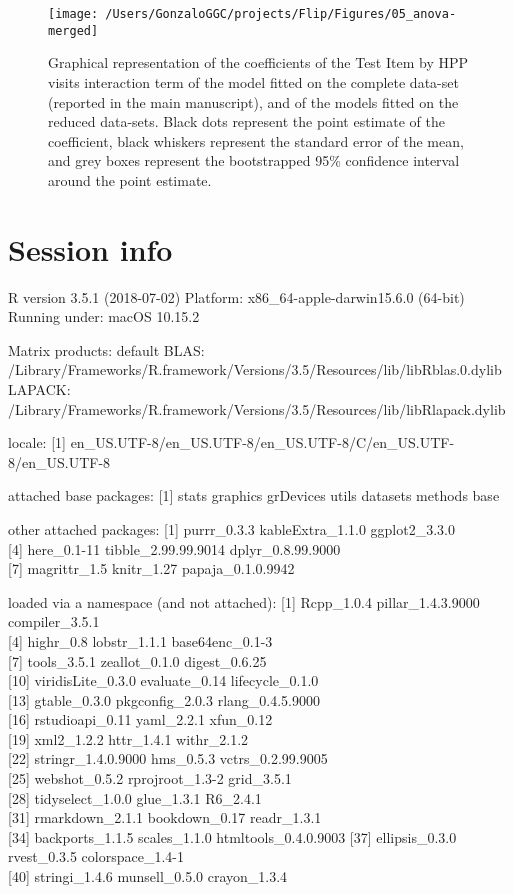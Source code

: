 \documentclass[english,man,man,floatsintext]{apa6}
\begin{document}
\begin{appendix}
\begin{figure}
\texttt{[image: /Users/GonzaloGGC/projects/Flip/Figures/05\_anova-merged]} \caption{Graphical representation of the coefficients of the Test Item by HPP visits interaction term of the model fitted on the complete data-set (reported in the main manuscript), and of the models fitted on the reduced data-sets. Black dots represent the point estimate of the coefficient, black whiskers represent the standard error of the mean, and grey boxes represent the bootstrapped 95\% confidence interval around the point estimate.}\label{fig:unnamed-chunk-16}
\end{figure}

\hypertarget{session-info}{%
\section{Session info}\label{session-info}}

R version 3.5.1 (2018-07-02) Platform: x86\_64-apple-darwin15.6.0
(64-bit) Running under: macOS 10.15.2

Matrix products: default BLAS:
/Library/Frameworks/R.framework/Versions/3.5/Resources/lib/libRblas.0.dylib
LAPACK:
/Library/Frameworks/R.framework/Versions/3.5/Resources/lib/libRlapack.dylib

locale: {[}1{]}
en\_US.UTF-8/en\_US.UTF-8/en\_US.UTF-8/C/en\_US.UTF-8/en\_US.UTF-8

attached base packages: {[}1{]} stats graphics grDevices utils datasets
methods base

other attached packages: {[}1{]} purrr\_0.3.3 kableExtra\_1.1.0
ggplot2\_3.3.0\\
{[}4{]} here\_0.1-11 tibble\_2.99.99.9014 dplyr\_0.8.99.9000\\
{[}7{]} magrittr\_1.5 knitr\_1.27 papaja\_0.1.0.9942

loaded via a namespace (and not attached): {[}1{]} Rcpp\_1.0.4
pillar\_1.4.3.9000 compiler\_3.5.1\\
{[}4{]} highr\_0.8 lobstr\_1.1.1 base64enc\_0.1-3\\
{[}7{]} tools\_3.5.1 zeallot\_0.1.0 digest\_0.6.25\\
{[}10{]} viridisLite\_0.3.0 evaluate\_0.14 lifecycle\_0.1.0\\
{[}13{]} gtable\_0.3.0 pkgconfig\_2.0.3 rlang\_0.4.5.9000\\
{[}16{]} rstudioapi\_0.11 yaml\_2.2.1 xfun\_0.12\\
{[}19{]} xml2\_1.2.2 httr\_1.4.1 withr\_2.1.2\\
{[}22{]} stringr\_1.4.0.9000 hms\_0.5.3 vctrs\_0.2.99.9005\\
{[}25{]} webshot\_0.5.2 rprojroot\_1.3-2 grid\_3.5.1\\
{[}28{]} tidyselect\_1.0.0 glue\_1.3.1 R6\_2.4.1\\
{[}31{]} rmarkdown\_2.1.1 bookdown\_0.17 readr\_1.3.1\\
{[}34{]} backports\_1.1.5 scales\_1.1.0 htmltools\_0.4.0.9003 {[}37{]}
ellipsis\_0.3.0 rvest\_0.3.5 colorspace\_1.4-1\\
{[}40{]} stringi\_1.4.6 munsell\_0.5.0 crayon\_1.3.4


\end{appendix}
\end{document}
